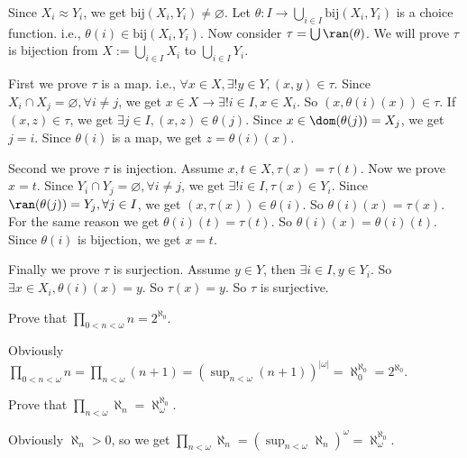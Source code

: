 \documentclass{ctexart}
\begin{document}
\begin{solution}
	Since \(X_i \approx Y_i\), we get \(\text{bij}(X_i,Y_i)\neq \varnothing\).
	Let \(\theta:I \to \bigcup_{i \in I} \text{bij}(X_i,Y_i)\) is a choice function. i.e., \(\theta(i)\in \text{bij}(X_i,Y_i)\).
	Now consider \(\tau=\bigcup \ran(\theta) \). We will prove \(\tau\) is bijection from \(X:=\bigcup_{i \in I} X_i\) to \(\bigcup_{i \in I} Y_i\).

	First we prove \(\tau\) is a map. i.e., \(\forall x \in X,\exists ! y \in Y,(x,y)\in \tau\).
	Since \(X_i \cap X_j = \varnothing , \forall i \neq j\), we get \(x \in X \to \exists ! i \in I,x \in X_i\).
	So \((x,\theta(i)(x)) \in \tau\). If \((x,z)\in \tau\), we get \(\exists j \in I,(x,z)\in \theta(j)\).
	Since \(x \in\dom(\theta(j))=X_j\), we get \(j=i\). Since \(\theta(i)\) is a map, we get \(z = \theta(i)(x)\).

	Second we prove \(\tau\) is injection. Assume \(x,t \in X,\tau(x)=\tau(t)\). Now we prove \(x=t\).
	Since \(Y_i \cap Y_j=\varnothing,\forall i \neq j\), we get \(\exists ! i \in I,\tau(x) \in Y_i\).
	Since \(\ran(\theta(j))=Y_j,\forall j \in I\), we get \((x,\tau(x)) \in \theta(i)\). So \(\theta(i)(x)=\tau(x)\).
	For the same reason we get \(\theta(i)(t)=\tau(t)\). So \(\theta(i)(x)=\theta(i)(t)\).
	Since \(\theta(i)\) is bijection, we get \(x=t\).

	Finally we prove \(\tau\) is surjection. Assume \(y \in Y\), then \(\exists i \in I,y \in Y_i\).
	So \(\exists x \in X_i,\theta(i)(x)=y\). So \(\tau(x)=y\). So \(\tau\) is surjective.
\end{solution}

\begin{problem}
Prove that \(\prod_{0 < n < \omega} n=2^{\aleph_0}\).
\end{problem}

\begin{solution}
	Obviously \(\prod_{0 < n < \omega} n=\prod_{n < \omega} (n+1)=\left(\sup_{n<\omega}(n+1) \right)^{|\omega|}=\aleph_0^{\aleph_0}=2^{\aleph_0} \).
\end{solution}

\begin{problem}
Prove that \(\prod_{n<\omega} \aleph_n=\aleph_\omega^{\aleph_0}\).
\end{problem}

\begin{solution}
	Obviously \(\aleph_n>0\), so we get \(\prod_{n<\omega} \aleph_n = \left(\sup_{n<\omega}\aleph_n\right)^{\omega}=\aleph_\omega^{\aleph_0}\).
\end{solution}
\end{document}
